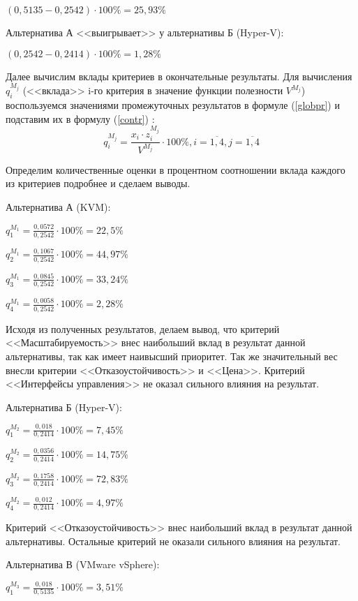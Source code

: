 $(0,5135 - 0,2542) \cdot 100\% = 25,93\%$

Альтернатива А <<выигрывает>> у альтернативы Б (Hyper-V):

$(0,2542 - 0,2414) \cdot 100\% = 1,28\%$

Далее вычислим вклады критериев в окончательные результаты.
Для вычисления $q_{i}^{M_j}$ (<<вклада>> i-го критерия в значение функции полезности $V^{M_j}$) воспользуемся значениями промежуточных результатов в формуле (\ref{globpr}) и подставим их в формулу (\ref{contr}) \cite{var-analyz}:
\begin{equation}\label{contr}
q_{i}^{M_j} = \frac{x_i \cdot z_{i}^{M_j}}{V^{M_j}} \cdot 100\%, i = \overline{1, 4}, j = \overline{1, 4}
\end{equation}

Определим количественные оценки в процентном соотношении вклада каждого из критериев подробнее и сделаем выводы.

Альтернатива А (KVM):

$q_{1}^{M_1} = \frac{0,0572}{0,2542} \cdot 100\% = 22,5\%$

$q_{2}^{M_1} = \frac{0,1067}{0,2542} \cdot 100\% = 44,97\%$

$q_{3}^{M_1} = \frac{0,0845}{0,2542} \cdot 100\% = 33,24\%$

$q_{4}^{M_1} = \frac{0,0058}{0,2542} \cdot 100\% = 2,28\%$

Исходя из полученных результатов, делаем вывод, что критерий <<Масштабируемость>> внес наибольший вклад в результат данной альтернативы, так как имеет наивысший приоритет.
Так же значительный вес внесли критерии <<Отказоустойчивость>> и <<Цена>>.
Критерий <<Интерфейсы управления>> не оказал сильного влияния на результат.

Альтернатива Б (Hyper-V):

$q_{1}^{M_2} = \frac{0,018}{0,2414} \cdot 100\% = 7,45\%$

$q_{2}^{M_2} = \frac{0,0356}{0,2414} \cdot 100\% = 14,75\%$

$q_{3}^{M_2} = \frac{0,1758}{0,2414} \cdot 100\% = 72,83\%$

$q_{4}^{M_2} = \frac{0,012}{0,2414} \cdot 100\% = 4,97\%$

Критерий <<Отказоустойчивость>> внес наибольший вклад в результат данной альтернативы.
Остальные критерий не оказали сильного влияния на результат.

Альтернатива В (VMware vSphere):

$q_{1}^{M_3} = \frac{0,018}{0,5135} \cdot 100\% = 3,51\%$

